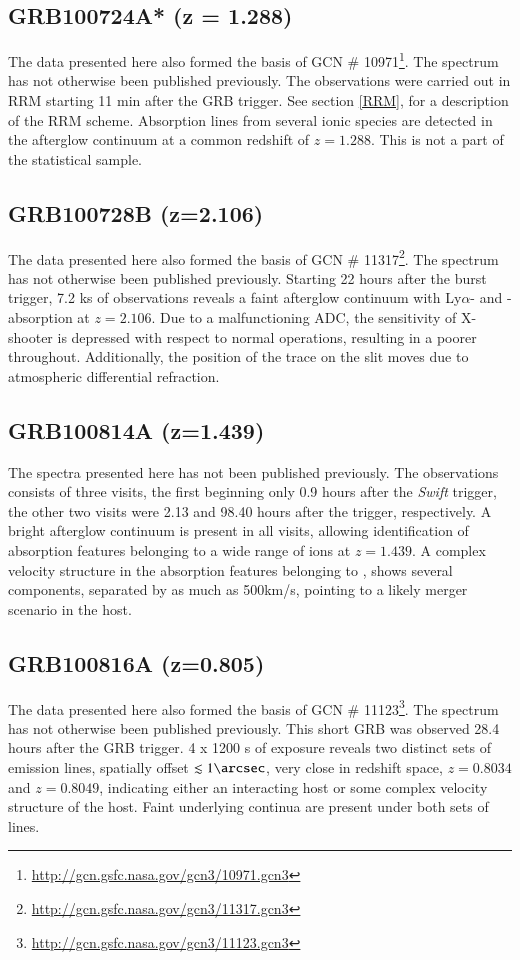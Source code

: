 \documentclass[iop, twocolappendix, numberedappendix, tighten, appendixfloats]{emulateapj}
\newcommand{\lya}{Ly$\alpha$}
\newcommand{\mgii}{\ion{Mg}{2}}
\begin{document}
	
	\subsection{GRB100724A* (z = 1.288)}
	The data presented here also formed the basis of GCN \#
	10971\footnote{\url{http://gcn.gsfc.nasa.gov/gcn3/10971.gcn3}}. The spectrum
	has not otherwise been published previously. The observations were carried out
	in RRM starting 11 min after the GRB trigger. See section \ref{RRM}, for a
	description of the RRM scheme. Absorption lines from several ionic species are
	detected in the afterglow continuum at a common redshift of $z = 1.288$. This
	is not a part of the statistical sample.

	\subsection{GRB100728B (z=2.106)}
	The data presented here also formed the basis of GCN \#
	11317\footnote{\url{http://gcn.gsfc.nasa.gov/gcn3/11317.gcn3}}. The spectrum
	has not otherwise been published previously. Starting 22 hours after the burst
	trigger, 7.2 ks of observations reveals a faint afterglow continuum with \lya-
	and \mgii-absorption at $z=2.106$. Due to a malfunctioning ADC, the sensitivity
	of X-shooter is depressed with respect to normal operations, resulting in a
	poorer throughout. Additionally, the position of the trace on the slit moves
	due to atmospheric differential refraction.

	\subsection{GRB100814A (z=1.439)}
    The spectra presented here has not been published previously. The
    observations consists of three visits, the first beginning only 0.9 hours
    after the \textit{Swift} trigger, the other two visits were 2.13 and 98.40
    hours after the trigger, respectively. A bright afterglow continuum is
    present in all visits, allowing identification of absorption features
    belonging to a wide range of ions at $z=1.439$. A complex velocity structure
    in the absorption features belonging to \mgii, shows several components,
    separated by as much as 500km/s, pointing to a likely merger scenario in
    the host.
    
	\subsection{GRB100816A (z=0.805)}
	The data presented here also formed the basis of GCN \#
	11123\footnote{\url{http://gcn.gsfc.nasa.gov/gcn3/11123.gcn3}}. The spectrum
	has not otherwise been published previously. This short GRB was observed 28.4
	hours after the GRB trigger. 4 x 1200 s of exposure reveals two distinct sets
	of emission lines, spatially offset $\lesssim 1 \arcsec $, very close in
	redshift space, $z=0.8034$ and $z=0.8049$, indicating either an interacting
	host or some complex velocity structure of the host. Faint underlying continua
	are present under both sets of lines.
\end{document}
